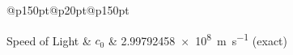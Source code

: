 
\begin{constants}{@{}p{150pt}@{}p{20pt}@{}p{150pt}} %


Speed of Light & $c_{0}$ & \SI{2.99792458e8}{\meter\per\second} (exact)\\

\end{constants}
